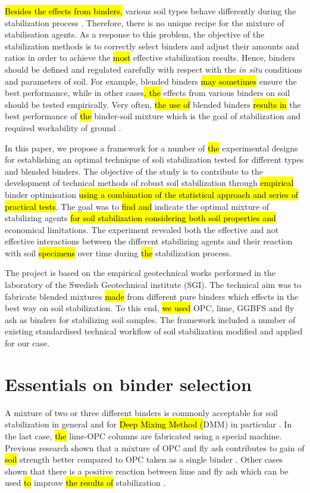 \documentclass[eprint,
]{actapoly}
\begin{document}
\hl{Besides the effects from binders, }various soil types behave differently during the stabilization process \citep{BhattacharjaBhatty,Burroughs2008,Renjithetal2020,VENDAOLIVEIRA2018336,Wall}. Therefore, there is no unique recipe for the mixture of stabilisation agents. As a response to this problem, the objective of the stabilization methods is to correctly select binders and adjust their amounts and ratios in order to achieve the \hl{most }effective stabilization results. Hence, binders should be defined and regulated carefully with respect with the \emph{in situ} conditions and parameters of soil. For example,\hl{ }blended binders \hl{may sometimes }ensure the best performance, while in other cases\hl{, the }effects from various binders on soil should be tested empirically. Very often, \hl{the use of }blended binders \hl{results in }the best performance of \hl{the }binder-soil mixture which is the goal of stabilization and required workability of ground \citep{Schanz,Kangetal2019}. 

In this paper, we propose a framework for a number of \hl{the }experimental designs for establishing an optimal technique of soli stabilization tested for different types and blended binders. The objective of the study is to contribute to the development of technical methods of robust soil stabilization through \hl{empirical }binder optimisation\hl{ using a combination of the statistical approach and series of practical tests}. The goal was to \hl{find and }indicate the optimal mixture of stabilizing agents \hl{for soil stabilization considering both soil properties and }economical limitations. The experiment revealed both the effective and not effective interactions between the different stabilizing agents and their reaction with soil \hl{specimens }over time during \hl{the }stabilization process. 

The project is based on the empirical geotechnical works performed in the laboratory of the Swedish Geotechnical institute (SGI). The technical aim was to fabricate\hl{ }blended mixtures \hl{made} from\hl{ }different pure binders which effects in the best\hl{ }way on soil stabilization. To this end, \hl{we used }OPC, lime, GGBFS and fly ash\hl{ }as binders for stabilizing soil samples. The framework included a number of existing standardised technical workflow of soil stabilization modified and applied for our case.

\section{Essentials on binder selection}
A mixture of two or three different binders is commonly acceptable for soil stabilization in general and for \hl{Deep Mixing Method (}DMM) in particular \cite{BergmanLarsson,Naqshabandy,Paniagua}. In the last case, \hl{the }lime-OPC columns are fabricated using a special machine. Previous research shown that a mixture of OPC and fly ash contributes to gain of \hl{soil }strength better compared to\hl{ }OPC taken as a single binder \cite{Yaxuetal2022,Vukicevicetal}. Other cases shown that there is a positive reaction between lime and fly ash which can be used \hl{to }improve\hl{ the results of }stabilization \cite{GoswamiSingh,Raoetal2008,Knapiketal2015}. 
\end{document}
